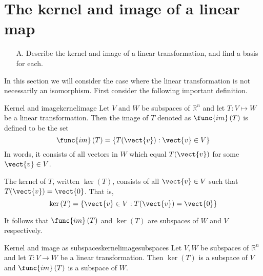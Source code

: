 \section{The kernel and image of a linear map}

\begin{outcome}
\begin{enumerate}
\item[A.]  Describe the kernel and image of a linear transformation, and find a basis for each. 
\end{enumerate}
\end{outcome}

In this section we will consider the case where the linear transformation is not necessarily an
isomorphism. First consider the following important definition.

\begin{definition}{Kernel and image}{kernelimage}
Let $V$ and $W$ be subspaces of $\mathbb{R}^n$ and let $T:V\mapsto W$ be a linear transformation. Then the image of $T$
denoted as $\func{im}\left( T\right) $ is defined to be the set 
\begin{equation*}
\func{im}\left( T\right) = \left\{T (\vect{v}):\vect{v}\in V\right\}
\end{equation*}
In words, it consists of all vectors in $W$ which equal $T(\vect{v})$ for some $
\vect{v}\in V$.

The kernel of $T$, written $\ker \left( T\right) $, consists of all $\vect{v}\in V$ such that $T(\vect{v})=\vect{0}$. That is, 
\begin{equation*}
\ker \left( T\right) =\left\{ \vect{v}\in V:T(\vect{v})=\vect{0}\right\}
\end{equation*}
\end{definition}

It follows that $\func{im}\left( T\right) $ and $\ker \left( T\right) $
are subspaces of $W$ and $V$ respectively.

\begin{proposition}{Kernel and image as subspaces}{kernelimagesubspaces}
Let $V, W$ be subspaces of $\mathbb{R}^n$ and let $T:V\rightarrow W$ be a linear transformation. Then $\ker \left(
T\right) $ is a subspace of $V$ and $\func{im}\left( T\right) $ is a
subspace of $W$.
\end{proposition}

